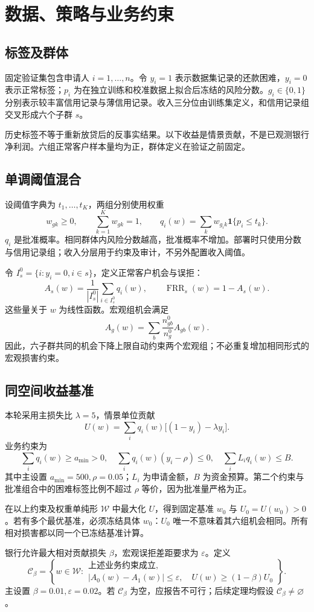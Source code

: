 \documentclass[UTF8,11pt,fontset=fandol]{ctexart}
\newcommand{\C}{\mathcal C}
\newcommand{\W}{\mathcal W}
\begin{document}
\section{数据、策略与业务约束}
\subsection{标签及群体}
固定验证集包含申请人 $i=1,\ldots,n$。令 $y_i=1$ 表示数据集记录的还款困难，$y_i=0$ 表示正常标签；$p_i$ 为在独立训练和校准数据上拟合后冻结的风险分数。$g_i\in\{0,1\}$ 分别表示较丰富信用记录与薄信用记录。收入三分位由训练集定义，和信用记录组交叉形成六个子群 $s$。

历史标签不等于重新放贷后的反事实结果。以下收益是情景贡献，不是已观测银行净利润。六组正常客户样本量均为正，群体定义在验证之前固定。

\subsection{单调阈值混合}
设阈值字典为 $t_1,\ldots,t_K$，两组分别使用权重
\[
w_{gk}\ge0,\qquad \sum_{k=1}^{K}w_{gk}=1,\qquad
q_i(w)=\sum_k w_{g_i k}\mathbf1\{p_i\le t_k\}.
\]
$q_i$ 是批准概率。相同群体内风险分数越高，批准概率不增加。部署时只使用分数与信用记录组；收入分层用于约束及审计，不另外配置收入阈值。

令 $I_s^0=\{i:y_i=0,i\in s\}$，定义正常客户机会与误拒：
\[
A_s(w)=\frac1{|I_s^0|}\sum_{i\in I_s^0}q_i(w),\qquad
\operatorname{FRR}_s(w)=1-A_s(w).
\]
这些量关于 $w$ 为线性函数。宏观组机会满足
\[
A_g(w)=\sum_b\frac{n_{gb}^0}{n_g^0}A_{gb}(w).
\]
因此，六子群共同的机会下降上限自动约束两个宏观组；不必重复增加相同形式的宏观损害约束。

\subsection{同空间收益基准}
本轮采用主损失比 $\lambda=5$，情景单位贡献
\[
U(w)=\sum_i q_i(w)\big[(1-y_i)-\lambda y_i\big].
\]
业务约束为
\[
\sum_iq_i(w)\ge a_{\min}>0,\quad
\sum_iq_i(w)(y_i-\rho)\le0,\quad
\sum_iL_iq_i(w)\le B.
\]
其中主设置 $a_{\min}=500,\rho=0.05$；$L_i$ 为申请金额，$B$ 为资金预算。第二个约束与批准组合中的困难标签比例不超过 $\rho$ 等价，因为批准量严格为正。

在以上约束及权重单纯形 $\W$ 中最大化 $U$，得到固定基准 $w_0$ 与 $U_0=U(w_0)>0$。若有多个最优基准，必须冻结具体 $w_0$：$U_0$ 唯一不意味着其六组机会相同。所有相对损害都以同一个已冻结基准计算。

银行允许最大相对贡献损失 $\beta$，宏观误拒差距要求为 $\varepsilon$。定义
\[
\C_\beta=\left\{w\in\W:
\begin{array}{l}
\text{上述业务约束成立},\\
|A_0(w)-A_1(w)|\le\varepsilon,\quad
U(w)\ge(1-\beta)U_0
\end{array}\right\}.
\]
主设置 $\beta=0.01,\varepsilon=0.02$。若 $\C_\beta$ 为空，应报告不可行；后续定理均假设 $\C_\beta\ne\varnothing$。
\end{document}
